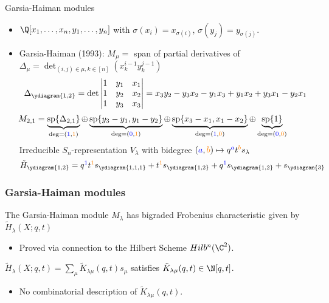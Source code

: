 \documentclass[dvipsnames]{beamer}
\renewcommand{\Span}{\operatorname{sp}}
\theoremstyle{definition}
\newcounter{c}
\begin{document}
\begin{frame}{Garsia-Haiman modules}
  \begin{itemize}
  \item \(\Q[x_1,\ldots,x_n,y_1,\ldots,y_n]\) with 
    \(\sigma(x_i) = x_{\sigma(i)}\), \(\sigma(y_j) = y_{\sigma(j)}\).\pause
  \item Garsia-Haiman (1993): \(M_\mu = \) span of partial derivatives of
    \(\Delta_\mu = \det_{(i,j) \in \mu, k \in [n]} (x_k^{i-1} y_k^{j-1})\) \pause \[
      \Delta_{\ydiagram{1,2}} = \det \left|
        \begin{matrix}
          1 & y_1 & x_1 \\
          1 & y_2 & x_2 \\
          1 & y_3 & x_3
        \end{matrix}
      \right| = x_3 y_2 - y_3 x_2 - y_1 x_3 + y_1 x_2 + y_3 x_1 - y_2 x_1
    \]
    \pause
  \[
    \hspace{-3em}
      M_{2,1} = \underbrace{\Span\{\Delta_{2,1}\}}_{\deg = (\textcolor{blue}{1},\textcolor{orange}{1})}
      \oplus \underbrace{\Span\{y_3-y_1, y_1 - y_2\}}_{\deg = (\textcolor{blue}{0},\textcolor{orange}{1})}
      \oplus \underbrace{\Span\{x_3-x_1, x_1 - x_2\}}_{\deg =  (\textcolor{blue}{1},\textcolor{orange}{0})}
      \oplus \underbrace{\Span \{1\}}_{\deg = (\textcolor{blue}{0},\textcolor{orange}{0})}
    \]
    \pause
    Irreducible \(S_n\)-representation \(V_\lambda\) with bidegree \((\textcolor{blue}{a},\textcolor{orange}{b}) \mapsto
    q^{\textcolor{blue}{a}}t^{\textcolor{orange}{b}} s_\lambda\) \pause \[
      \tilde{H}_{\ydiagram{1,2}} = q^{\textcolor{blue}{1}}t^{\textcolor{orange}{1}} s_{\ydiagram{1,1,1}} + t^{\textcolor{orange}{1}}
      s_{\ydiagram{1,2}} + q^{\textcolor{blue}{1}} s_{\ydiagram{1,2}} + s_{\ydiagram{3}}
    \]
  \end{itemize}
\end{frame}
\begin{frame}
  \frametitle{Garsia-Haiman modules}
  \begin{theorem}[Haiman, 2001]
    The Garsia-Haiman module \(M_\lambda\) has bigraded Frobenius
    characteristic given by \(\tilde{H}_\lambda(X;q,t)\)
  \end{theorem}\pause
  \begin{itemize}
  \item Proved via connection to the Hilbert Scheme \(Hilb^n(\C^2)\).\pause
  \end{itemize}
  \begin{corollary}
    \(\tilde{H}_\lambda(X;q,t) = \sum_\mu \tilde{K}_{\lambda \mu}(q,t) s_\mu\)
    satisfies \(\tilde{K}_{\lambda \mu}(q,t) \in \N[q,t]\).
  \end{corollary}\pause
  \begin{itemize}
  \item No combinatorial description of \(\tilde{K}_{\lambda \mu}(q,t)\).
  \end{itemize}
  \end{frame}
\end{document}
